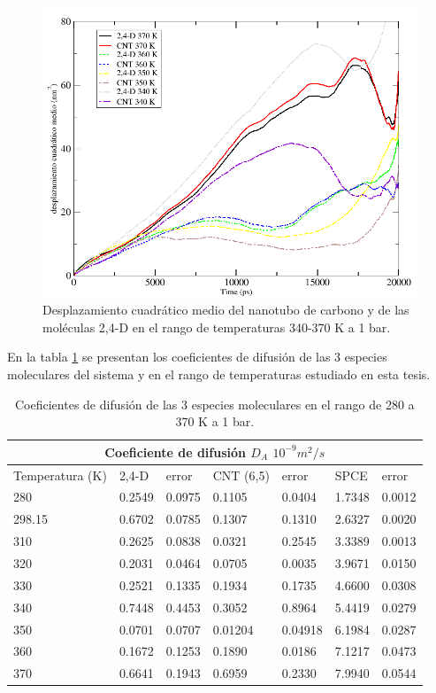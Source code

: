 \begin{figure}[!h]
    \centering
    \includegraphics[width=.8\textwidth,keepaspectratio=true]{resultados/comparacion_msd_cnt_24d_340-370.png}
    \caption{Desplazamiento cuadrático medio del nanotubo de carbono y de las moléculas 2,4-D en el rango de temperaturas 340-370 K a 1 bar.}
    \label{fig:comparación_msd_cnt_24d_340-370}
\end{figure}

En la tabla \ref{tab:coefdifall} se presentan los coeficientes de difusión de las 3 especies moleculares del sistema y en el rango de temperaturas estudiado en esta tesis.\\

\newpage

\begin{table}[h!]
    \centering
    \begin{tabular}{ |m{8em}|m{3em}|m{3em}|m{5em}|m{3em}|m{3em}|m{3em}|  }
    \hline
    \multicolumn{7}{|c|}{Coeficiente de difusión $D_A$ $10^{-9}m^2/s$} \\
    \hline
    Temperatura (K) & 2,4-D & error & CNT (6,5) & error & SPCE & error\\
    \hline
    280 &  0.2549 & 0.0975 & 0.1105 & 0.0404 & 1.7348 & 0.0012\\
    \hline
    298.15 &  0.6702 & 0.0785 & 0.1307 & 0.1310 & 2.6327 & 0.0020\\
    \hline
    310 &  0.2625 & 0.0838 & 0.0321 & 0.2545 & 3.3389 & 0.0013\\
    \hline
    320 &  0.2031 & 0.0464 & 0.0705 & 0.0035 & 3.9671 & 0.0150\\
    \hline
    330 &  0.2521 & 0.1335 & 0.1934 & 0.1735 & 4.6600 & 0.0308\\
    \hline
    340 &  0.7448 & 0.4453 & 0.3052 & 0.8964 & 5.4419 & 0.0279\\
    \hline
    350 &  0.0701 & 0.0707 & 0.01204 & 0.04918 & 6.1984 & 0.0287\\
    \hline
    360 &  0.1672 & 0.1253 & 0.1890 & 0.0186 & 7.1217 & 0.0473\\
    \hline
    370 &  0.6641 & 0.1943 & 0.6959 & 0.2330 & 7.9940 & 0.0544\\
    \hline
    \end{tabular}
    \caption{Coeficientes de difusión de las 3 especies moleculares en el rango de 280 a 370 K a 1 bar.}
    \label{tab:coefdifall}
\end{table} 

